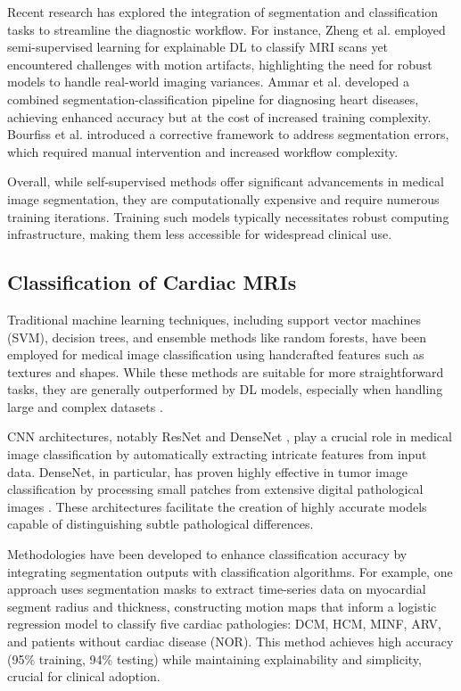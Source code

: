 \documentclass[fleqn,10pt]{wlscirep}
\begin{document}
Recent research has explored the integration of segmentation and classification tasks to streamline the diagnostic workflow. For instance, Zheng et al. \cite{Zheng:2019} employed semi-supervised learning for explainable DL to classify MRI scans yet encountered challenges with motion artifacts, highlighting the need for robust models to handle real-world imaging variances. Ammar et al. \cite{Ammar:2021} developed a combined segmentation-classification pipeline for diagnosing heart diseases, achieving enhanced accuracy but at the cost of increased training complexity. Bourfiss et al. \cite{Bourfiss:2023} introduced a corrective framework to address segmentation errors, which required manual intervention and increased workflow complexity.

Overall, while self-supervised methods offer significant advancements in medical image segmentation, they are computationally expensive and require numerous training iterations. Training such models typically necessitates robust computing infrastructure, making them less accessible for widespread clinical use.

\subsection*{Classification of Cardiac MRIs}

Traditional machine learning techniques, including support vector machines (SVM), decision trees, and ensemble methods like random forests, have been employed for medical image classification using handcrafted features such as textures and shapes. While these methods are suitable for more straightforward tasks, they are generally outperformed by DL models, especially when handling large and complex datasets \cite{Mofrad:2022}.

CNN architectures, notably ResNet \cite{He:2016} and DenseNet \cite{Huang:2017}, play a crucial role in medical image classification by automatically extracting intricate features from input data. DenseNet, in particular, has proven highly effective in tumor image classification by processing small patches from extensive digital pathological images \cite{Mofrad:2022}. These architectures facilitate the creation of highly accurate models capable of distinguishing subtle pathological differences.

Methodologies have been developed to enhance classification accuracy by integrating segmentation outputs with classification algorithms. For example, one approach \cite{Mofrad:2022} uses segmentation masks to extract time-series data on myocardial segment radius and thickness, constructing motion maps that inform a logistic regression model to classify five cardiac pathologies: DCM, HCM, MINF, ARV, and patients without cardiac disease (NOR). This method achieves high accuracy (95\% training, 94\% testing) while maintaining explainability and simplicity, crucial for clinical adoption.
\end{document}
